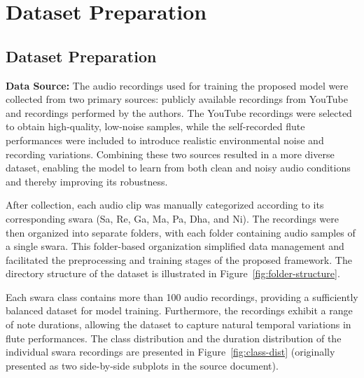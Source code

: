 \chapter{Dataset Preparation}
\label{ch:dataset}

\section{Dataset Preparation}

\textbf{Data Source:} The audio recordings used for training the proposed model were collected from two primary sources: publicly available recordings from YouTube and recordings performed by the authors. The YouTube recordings were selected to obtain high-quality, low-noise samples, while the self-recorded flute performances were included to introduce realistic environmental noise and recording variations. Combining these two sources resulted in a more diverse dataset, enabling the model to learn from both clean and noisy audio conditions and thereby improving its robustness.

After collection, each audio clip was manually categorized according to its corresponding swara (Sa, Re, Ga, Ma, Pa, Dha, and Ni). The recordings were then organized into separate folders, with each folder containing audio samples of a single swara. This folder-based organization simplified data management and facilitated the preprocessing and training stages of the proposed framework. The directory structure of the dataset is illustrated in Figure~\ref{fig:folder-structure}.


Each swara class contains more than 100 audio recordings, providing a sufficiently balanced dataset for model training. Furthermore, the recordings exhibit a range of note durations, allowing the dataset to capture natural temporal variations in flute performances. The class distribution and the duration distribution of the individual swara recordings are presented in Figure~\ref{fig:class-dist} (originally presented as two side-by-side subplots in the source document).


